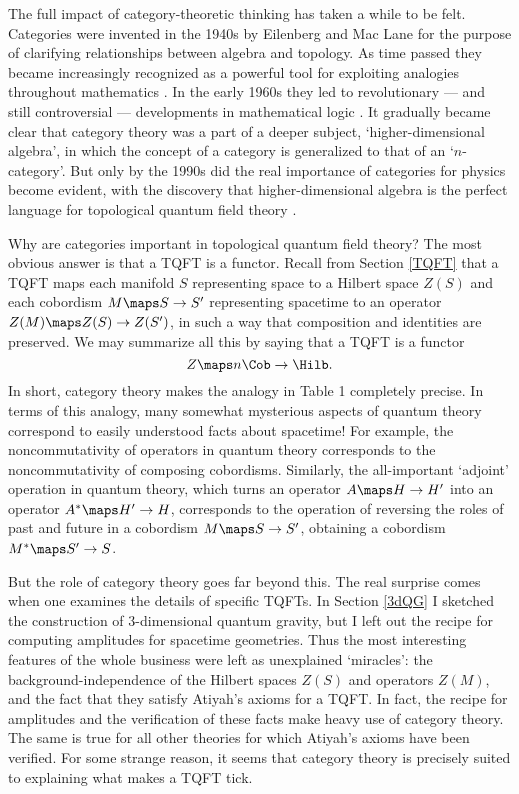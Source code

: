 The full impact of category-theoretic thinking has taken a while to be
felt.  Categories were invented in the 1940s by Eilenberg and Mac Lane
for the purpose of clarifying relationships between algebra and
topology.  As time passed they became increasingly recognized as a
powerful tool for exploiting analogies throughout mathematics
\cite{MacLane}.   In the early 1960s they led to revolutionary --- and
still controversial --- developments in mathematical logic
\cite{Goldblatt}.  It gradually became clear that category theory
was a part of a deeper subject, `higher-dimensional algebra', in which
the concept of a category is generalized to that of an `$n$-category'.
But only by the 1990s did the real importance of categories for physics
become evident, with the discovery that higher-dimensional algebra is
the perfect language for topological quantum field theory \cite{Crane,L}.

Why are categories important in topological quantum field theory? 
The most obvious answer is that a TQFT is a functor.  Recall from Section
\ref{TQFT} that a TQFT maps each manifold $S$ representing space to a
Hilbert space $Z(S)$ and each cobordism $M \maps S \to S'$ representing
spacetime to an operator $Z(M) \maps Z(S) \to Z(S')$, in such a
way that composition and identities are preserved.  We may summarize all
this by saying that a TQFT is a functor 
\[   Z \maps   n\Cob \to \Hilb.  \]
In short, category theory makes the analogy in Table 1 completely
precise.  In terms of this analogy, many somewhat mysterious aspects of
quantum theory correspond to easily understood facts about spacetime!
For example, the noncommutativity of operators in quantum
theory corresponds to the noncommutativity of composing cobordisms. 
Similarly, the all-important `adjoint' operation in quantum theory,
which turns an operator $A \maps  H \to H'$ into an operator $A^* \maps
H' \to H$, corresponds to the operation of reversing the roles of past
and future in a cobordism $M \maps S \to S'$, obtaining a cobordism $M^*
\maps S' \to S$.  

But the role of category theory goes far beyond this.  The real surprise
comes when one examines the details of specific TQFTs.  In Section
\ref{3dQG} I sketched the construction of 3-dimensional quantum gravity,
but I left out the recipe for computing amplitudes for spacetime
geometries.   Thus the most interesting features of the whole business
were left as unexplained `miracles': the background-independence of the
Hilbert spaces $Z(S)$ and operators $Z(M)$, and the fact that they
satisfy Atiyah's axioms for a TQFT.   In fact, the recipe for amplitudes
and the verification of these facts make heavy use of category theory. 
The same is true for all other theories for which Atiyah's axioms have
been verified.  For some strange reason, it seems that category theory is
precisely suited to explaining what makes a TQFT tick.

